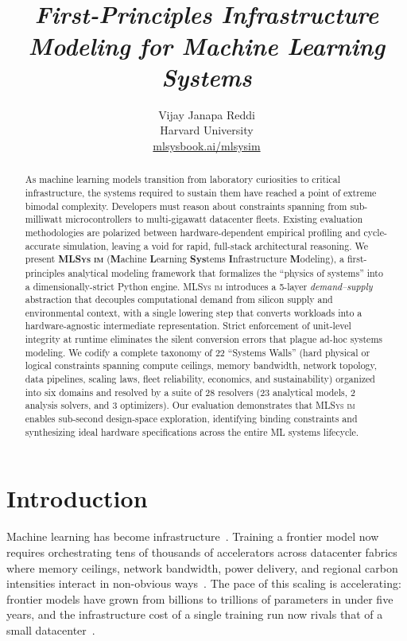 \documentclass[10pt,twocolumn]{article}
\title{
  {\Huge\bfseries \mlsysim}\\[0.4em]
  \Large\normalfont\itshape First-Principles Infrastructure Modeling for Machine Learning Systems
}
\author{
  \fontsize{12}{15}\selectfont
  Vijay Janapa Reddi\\[0.2em]
  \fontsize{11}{14}\selectfont
  Harvard University\\[0.6em]
  \fontsize{10}{12}\selectfont
  \textcolor{gray!60}{\href{https://mlsysbook.ai/mlsysim}{mlsysbook.ai/mlsysim}}
}
\date{}
\newcommand{\mlsysim}{\mbox{\textsc{MLSys}\,\textperiodcentered\,\textsc{im}}\xspace}
\newcommand{\MLSYSIM}{\textbf{\mlsysim}}
\begin{document}
\maketitle
\vspace{-1.5em}

\begin{abstract}
As machine learning models transition from laboratory curiosities to critical infrastructure, the systems required to sustain them have reached a point of extreme bimodal complexity. Developers must reason about constraints spanning from sub-milliwatt microcontrollers to multi-gigawatt datacenter fleets. Existing evaluation methodologies are polarized between hardware-dependent empirical profiling and cycle-accurate simulation, leaving a void for rapid, full-stack architectural reasoning. We present \MLSYSIM{} (\textbf{M}achine \textbf{L}earning \textbf{Sys}tems \textbf{I}nfrastructure \textbf{M}odeling), a first-principles analytical modeling framework that formalizes the ``physics of systems'' into a dimensionally-strict Python engine. \mlsysim introduces a 5-layer \emph{demand--supply} abstraction that decouples computational demand from silicon supply and environmental context, with a single lowering step that converts workloads into a hardware-agnostic intermediate representation. Strict enforcement of unit-level integrity at runtime eliminates the silent conversion errors that plague ad-hoc systems modeling. We codify a complete taxonomy of 22 ``Systems Walls'' (hard physical or logical constraints spanning compute ceilings, memory bandwidth, network topology, data pipelines, scaling laws, fleet reliability, economics, and sustainability) organized into six domains and resolved by a suite of 28 resolvers (23 analytical models, 2 analysis solvers, and 3 optimizers). Our evaluation demonstrates that \mlsysim enables sub-second design-space exploration, identifying binding constraints and synthesizing ideal hardware specifications across the entire ML systems lifecycle.
\end{abstract}

\section{Introduction}
\label{sec:intro}

Machine learning has become infrastructure~\citep{sutton2019bitter}. Training a frontier model now requires orchestrating tens of thousands of accelerators across datacenter fabrics where memory ceilings, network bandwidth, power delivery, and regional carbon intensities interact in non-obvious ways~\citep{dean2012large,shoeybi2019megatron}. The pace of this scaling is accelerating: frontier models have grown from billions to trillions of parameters in under five years, and the infrastructure cost of a single training run now rivals that of a small datacenter~\citep{deepseek2025v3}.
\end{document}

